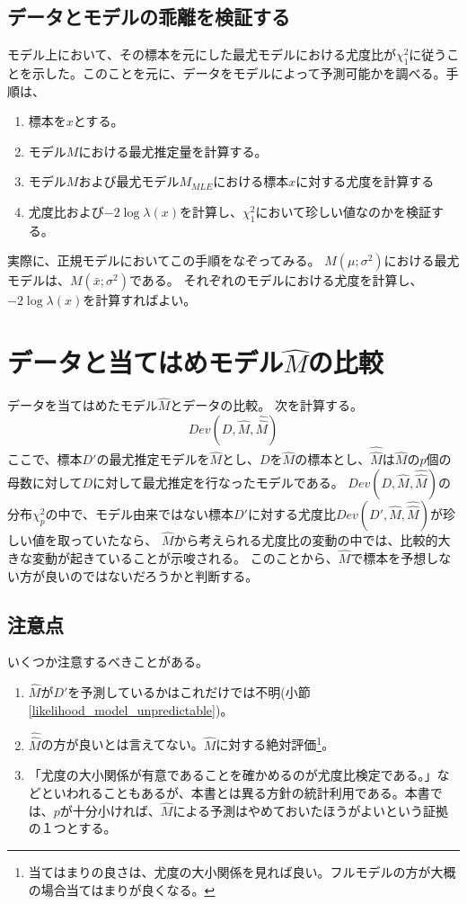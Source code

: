 \subsection{データとモデルの乖離を検証する}
モデル上において、その標本を元にした最尤モデルにおける尤度比が$\chi^2_1$に従うことを示した。このことを元に、データをモデルによって予測可能かを調べる。手順は、
\begin{enumerate}
    \item 標本を$x$とする。
    \item モデル$M$における最尤推定量を計算する。
    \item モデル$M$および最尤モデル$M_{MLE}$における標本$x$に対する尤度を計算する
    \item 尤度比および$-2\log\lambda(x)$を計算し、$\chi^2_1$において珍しい値なのかを検証する。
\end{enumerate}
実際に、正規モデルにおいてこの手順をなぞってみる。
$M(\mu;\sigma^2)$における最尤モデルは、$M(\bar{x};\sigma^2)$である。
それぞれのモデルにおける尤度を計算し、$-2\log\lambda(x)$を計算すればよい。



\section{データと当てはめモデル$\hat{M}$の比較}
データを当てはめたモデル$\hat{M}$とデータの比較。
次を計算する。
\begin{equation*}
    Dev(D,\hat{M},\hat{\hat{M}})
\end{equation*}
ここで、標本$D'$の最尤推定モデルを$\hat{M}$とし、$D$を$\hat{M}$の標本とし、$\hat{\hat{M}}$は$\hat{M}$の$p$個の母数に対して$D$に対して最尤推定を行なったモデルである。
$Dev(D,\hat{M},\hat{\hat{M}}) $の分布$\chi^2_p$の中で、モデル由来ではない標本$D'$に対する尤度比$Dev(D',\hat{M},\hat{\hat{M}}) $が珍しい値を取っていたなら、
$\hat{M}$から考えられる尤度比の変動の中では、比較的大きな変動が起きていることが示唆される。
このことから、$\hat{M}$で標本を予想しない方が良いのではないだろうかと判断する。

\subsection{注意点}
いくつか注意するべきことがある。
\begin{enumerate}
 \item $\hat{M}$が$D'$を予測しているかはこれだけでは不明(小節\ref{likelihood_model_unpredictable})。
 \item $\hat{\hat{M}}$の方が良いとは言えてない。$\hat{M}$に対する絶対評価\footnote{当てはまりの良さは、尤度の大小関係を見れば良い。フルモデルの方が大概の場合当てはまりが良くなる。}。
 \item 「尤度の大小関係が有意であることを確かめるのが尤度比検定である。」などといわれることもあるが、本書とは異る方針の統計利用である。本書では、$p$が十分小ければ、$\hat{M}$による予測はやめておいたほうがよいという証拠の１つとする。
\end{enumerate}

